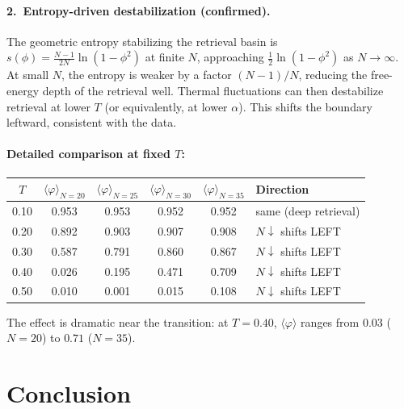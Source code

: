 \documentclass[11pt]{article}
\begin{document}
\paragraph{2.\ Entropy-driven destabilization (confirmed).}
The geometric entropy stabilizing the retrieval basin is $s(\phi) = \frac{N-1}{2N}\ln(1-\phi^2)$ at finite $N$, approaching $\frac{1}{2}\ln(1-\phi^2)$ as $N \to \infty$.  At small $N$, the entropy is weaker by a factor $(N-1)/N$, reducing the free-energy depth of the retrieval well.  Thermal fluctuations can then destabilize retrieval at lower $T$ (or equivalently, at lower $\alpha$).  This shifts the boundary leftward, consistent with the data.

\paragraph{Detailed comparison at fixed $T$:}

\begin{center}
\begin{tabular}{cccccl}
\toprule
$T$ & $\langle\varphi\rangle_{N=20}$ & $\langle\varphi\rangle_{N=25}$ & $\langle\varphi\rangle_{N=30}$ & $\langle\varphi\rangle_{N=35}$ & Direction \\
\midrule
0.10 & 0.953 & 0.953 & 0.952 & 0.952 & same (deep retrieval) \\
0.20 & 0.892 & 0.903 & 0.907 & 0.908 & $N\!\downarrow$ shifts LEFT \\
0.30 & 0.587 & 0.791 & 0.860 & 0.867 & $N\!\downarrow$ shifts LEFT \\
0.40 & 0.026 & 0.195 & 0.471 & 0.709 & $N\!\downarrow$ shifts LEFT \\
0.50 & 0.010 & 0.001 & 0.015 & 0.108 & $N\!\downarrow$ shifts LEFT \\
\bottomrule
\end{tabular}
\end{center}

The effect is dramatic near the transition: at $T = 0.40$, $\langle\varphi\rangle$ ranges from $0.03$ ($N = 20$) to $0.71$ ($N = 35$).

\section{Conclusion}
\end{document}
